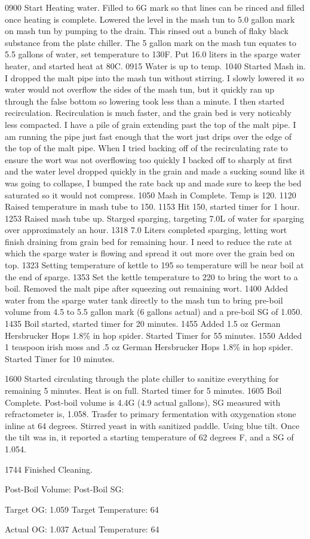 0900 Start Heating water.  Filled to 6G mark so that lines can be rinced and filled once heating is complete. Lowered the level in the mash tun to 5.0 gallon mark on mash tun by pumping to the drain.  This rinsed out a bunch of flaky black substance from the plate chiller.  The 5 gallon mark on the mash tun equates to 5.5 gallons of water, set temperature to 130F.  Put 16.0 liters in the sparge water heater, and started heat at 80C.  
0915 Water is up to temp.
1040 Started Mash in.  I dropped the malt pipe into the mash tun without stirring.  I slowly lowered it so water would not overflow the sides of the mash tun, but it quickly ran up through the false bottom so lowering took less than a minute.  I then started recirculation.  Recirculation is much faster, and the grain bed is very noticably less compacted.  I have a pile of grain extending past the top of the malt pipe.  I am running the pipe just fast enough that the wort just drips over the edge of the top of the malt pipe.  When I tried backing off of the recirculating rate to ensure the wort was not overflowing too quickly I backed off to sharply at first and the water level dropped quickly in the grain and made a sucking sound like it was going to collapse, I bumped the rate back up and made sure to keep the bed saturated so it would not compress.
1050 Mash in Complete. Temp is 120.
1120 Raised temperature in mash tube to 150.
1153 Hit 150, started timer for 1 hour.
1253 Raised mash tube up. Starged sparging, targeting 7.0L of water for sparging over approximately an hour.  
1318 7.0 Liters completed sparging, letting wort finish draining from grain bed for remaining hour.  I need to reduce the rate at which the sparge water is flowing and spread it out more over the grain bed on top.
1323 Setting temperature of kettle to 195 so temperature will be near boil at the end of sparge.
1353 Set the kettle temperature to 220 to bring the wort to a boil.  Removed the malt pipe after squeezing out remaining wort.
1400 Added water from the sparge water tank directly to the mash tun to bring pre-boil volume from 4.5 to 5.5 gallon mark (6 gallons actual) and a pre-boil SG of 1.050.
1435 Boil started, started timer for 20 minutes.
1455 Added 1.5 oz German Hersbrucker Hops 1.8\% in hop spider.  Started Timer for 55 minutes.
1550 Added 1 teaspoon irish moss and .5 oz  German Hersbrucker Hops 1.8\% in hop spider. Started Timer for 10 minutes.

1600 Started circulating through the plate chiller to sanitize everything for remaining 5 minutes.  Heat is on full. Started timer for 5 minutes.
1605 Boil Complete.  Post-boil volume is 4.4G (4.9 actual gallons), SG measured with refractometer is, 1.058. Trasfer to primary fermentation with oxygenation stone inline at 64 degrees.  Stirred yeast in with sanitized paddle. Using blue tilt. Once the tilt was in, it reported a starting temperature of 62 degrees F, and a SG of 1.054.

1744 Finished Cleaning.

Post-Boil Volume:
Post-Boil SG:

Target OG: 1.059
Target Temperature: 64

Actual OG: 1.037
Actual Temperature: 64

